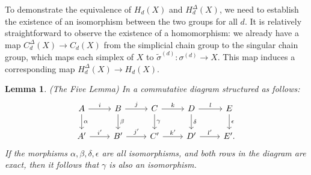 \documentclass{amsart}
\newtheorem{lemma}[definition]{Lemma}
\begin{document}
To demonstrate the equivalence of $H_d(X)$ and $H^\Delta_d(X)$, we need to establish the existence of an isomorphism between the two groups for all $d$. It is relatively straightforward to observe the existence of a homomorphism: we already have a map $C^\Delta_d(X) \rightarrow C_d(X)$ from the simplicial chain group to the singular chain group, which maps each simplex of $X$ to $\tilde{\sigma}^{(d)}: \sigma^{(d)} \rightarrow X$. This map induces a corresponding map $H^\Delta_d(X) \rightarrow H_d(X)$.

\begin{lemma}{(The Five Lemma)}
\label{fivelemma}
In a commutative diagram structured as follows:
\begin{equation}
\begin{tikzcd}
A \arrow[r, "i"] \arrow[d, "\alpha"] & B \arrow[r, "j"] \arrow[d, "\beta"] & C \arrow[r, "k"] \arrow[d, "\gamma"] & D \arrow[r, "l"] \arrow[d, "\delta"] & E \arrow[d, "\epsilon"] \\
A' \arrow[r, "i'"]                               & B' \arrow[r, "j'"]                              & C' \arrow[r, "k'"]                               & D' \arrow[r, "l'"]                               & E'.                                 
\end{tikzcd}
\end{equation}
If the morphisms $\alpha, \beta, \delta, \epsilon$ are all isomorphisms, and both rows in the diagram are exact, then it follows that $\gamma$ is also an isomorphism.
\end{lemma}
\end{document}
